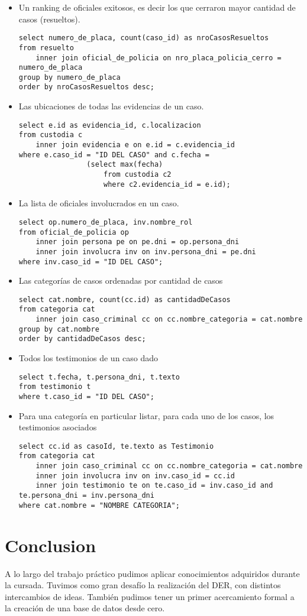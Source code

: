 \documentclass[10pt,a4paper]{article}
\begin{document}
\begin{itemize}
\begin{verbatim}
\end{verbatim}
\item Un ranking de oficiales exitosos, es decir los que cerraron mayor cantidad de casos
(resueltos).
\begin{verbatim}
select numero_de_placa, count(caso_id) as nroCasosResueltos 
from resuelto 
	inner join oficial_de_policia on nro_placa_policia_cerro = numero_de_placa 
group by numero_de_placa
order by nroCasosResueltos desc;
\end{verbatim}
\item Las ubicaciones de todas las evidencias de un caso.
\begin{verbatim}
select e.id as evidencia_id, c.localizacion 
from custodia c 
	inner join evidencia e on e.id = c.evidencia_id 
where e.caso_id = "ID DEL CASO" and c.fecha = 
				(select max(fecha) 
					from custodia c2 
					where c2.evidencia_id = e.id);
\end{verbatim}
\item La lista de oficiales involucrados en un caso.
\begin{verbatim}
select op.numero_de_placa, inv.nombre_rol 
from oficial_de_policia op 
	inner join persona pe on pe.dni = op.persona_dni 
	inner join involucra inv on inv.persona_dni = pe.dni 
where inv.caso_id = "ID DEL CASO";
\end{verbatim}
\item Las categorías de casos ordenadas por cantidad de casos
\begin{verbatim}
select cat.nombre, count(cc.id) as cantidadDeCasos 
from categoria cat 
	inner join caso_criminal cc on cc.nombre_categoria = cat.nombre 
group by cat.nombre 
order by cantidadDeCasos desc;
\end{verbatim}
\item Todos los testimonios de un caso dado
\begin{verbatim}
select t.fecha, t.persona_dni, t.texto 
from testimonio t 
where t.caso_id = "ID DEL CASO";
\end{verbatim}
\item Para una categoría en particular listar, para cada uno de los casos, los testimonios
asociados
\begin{verbatim}
select cc.id as casoId, te.texto as Testimonio 
from categoria cat 
	inner join caso_criminal cc on cc.nombre_categoria = cat.nombre 
	inner join involucra inv on inv.caso_id = cc.id 
	inner join testimonio te on te.caso_id = inv.caso_id and te.persona_dni = inv.persona_dni 
where cat.nombre = "NOMBRE CATEGORIA";
\end{verbatim}
\end{itemize}

\section{Conclusion}
A lo largo del trabajo práctico pudimos aplicar conocimientos adquiridos durante la cursada. Tuvimos como gran desafío la realización del DER, con distintos intercambios de ideas. También pudimos tener un primer acercamiento formal a la creación de una base de datos desde cero. 
\end{document}
